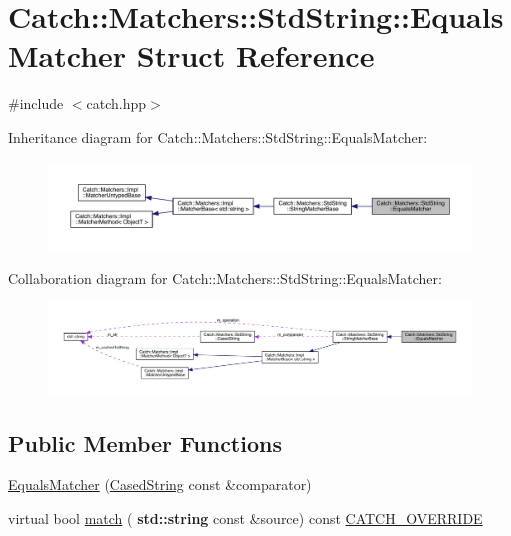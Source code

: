 \hypertarget{struct_catch_1_1_matchers_1_1_std_string_1_1_equals_matcher}{}\section{Catch\+:\+:Matchers\+:\+:Std\+String\+:\+:Equals\+Matcher Struct Reference}
\label{struct_catch_1_1_matchers_1_1_std_string_1_1_equals_matcher}


{\ttfamily \#include $<$catch.\+hpp$>$}



Inheritance diagram for Catch\+:\+:Matchers\+:\+:Std\+String\+:\+:Equals\+Matcher\+:
\nopagebreak
\begin{figure}[H]
\begin{center}
\leavevmode
\includegraphics[width=350pt]{struct_catch_1_1_matchers_1_1_std_string_1_1_equals_matcher__inherit__graph}
\end{center}
\end{figure}


Collaboration diagram for Catch\+:\+:Matchers\+:\+:Std\+String\+:\+:Equals\+Matcher\+:
\nopagebreak
\begin{figure}[H]
\begin{center}
\leavevmode
\includegraphics[width=350pt]{struct_catch_1_1_matchers_1_1_std_string_1_1_equals_matcher__coll__graph}
\end{center}
\end{figure}
\subsection*{Public Member Functions}
\begin{DoxyCompactItemize}
\item 
\hyperlink{struct_catch_1_1_matchers_1_1_std_string_1_1_equals_matcher_ab740f1fb2310e9fe3fed5134d4c7e4c8}{Equals\+Matcher} (\hyperlink{struct_catch_1_1_matchers_1_1_std_string_1_1_cased_string}{Cased\+String} const \&comparator)
\item 
virtual bool \hyperlink{struct_catch_1_1_matchers_1_1_std_string_1_1_equals_matcher_a2aeaac3c0efb8422643cd1b155256213}{match} (\textbf{ std\+::string} const \&source) const \hyperlink{catch_8hpp_a8ecdce4d3f57835f707915ae831eb847}{C\+A\+T\+C\+H\+\_\+\+O\+V\+E\+R\+R\+I\+DE}
\end{DoxyCompactItemize}

